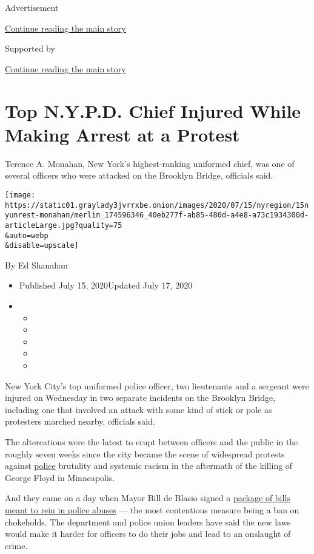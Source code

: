 Advertisement

\protect\hyperlink{after-top}{Continue reading the main story}

Supported by

\protect\hyperlink{after-sponsor}{Continue reading the main story}

\hypertarget{top-nypd-chief-injured-while-making-arrest-at-a-protest}{%
\section{Top N.Y.P.D. Chief Injured While Making Arrest at a
Protest}\label{top-nypd-chief-injured-while-making-arrest-at-a-protest}}

Terence A. Monahan, New York's highest-ranking uniformed chief, was one
of several officers who were attacked on the Brooklyn Bridge, officials
said.

\texttt{[image: https://static01.graylady3jvrrxbe.onion/images/2020/07/15/nyregion/15nyunrest-monahan/merlin\_174596346\_40eb277f-ab85-480d-a4e8-a73c1934300d-articleLarge.jpg?quality=75\\\&auto=webp\\\&disable=upscale]}

By Ed Shanahan

\begin{itemize}
\item
  Published July 15, 2020Updated July 17, 2020
\item
  \begin{itemize}
  \item
  \item
  \item
  \item
  \item
  \end{itemize}
\end{itemize}

New York City's top uniformed police officer, two lieutenants and a
sergeant were injured on Wednesday in two separate incidents on the
Brooklyn Bridge, including one that involved an attack with some kind of
stick or pole as protesters marched nearby, officials said.

The altercations were the latest to erupt between officers and the
public in the roughly seven weeks since the city became the scene of
widespread protests against
\href{https://www.nytimes3xbfgragh.onion/2020/07/17/us/portland-protests.html}{police}
brutality and systemic racism in the aftermath of the killing of George
Floyd in Minneapolis.

And they came on a day when Mayor Bill de Blasio signed a
\href{https://www.nytimes3xbfgragh.onion/2020/06/17/nyregion/police-reform-nypd.html}{package
of bills meant to rein in police abuses} --- the most contentious
measure being a ban on chokeholds. The department and police union
leaders have said the new laws would make it harder for officers to do
their jobs and lead to an onslaught of crime.

